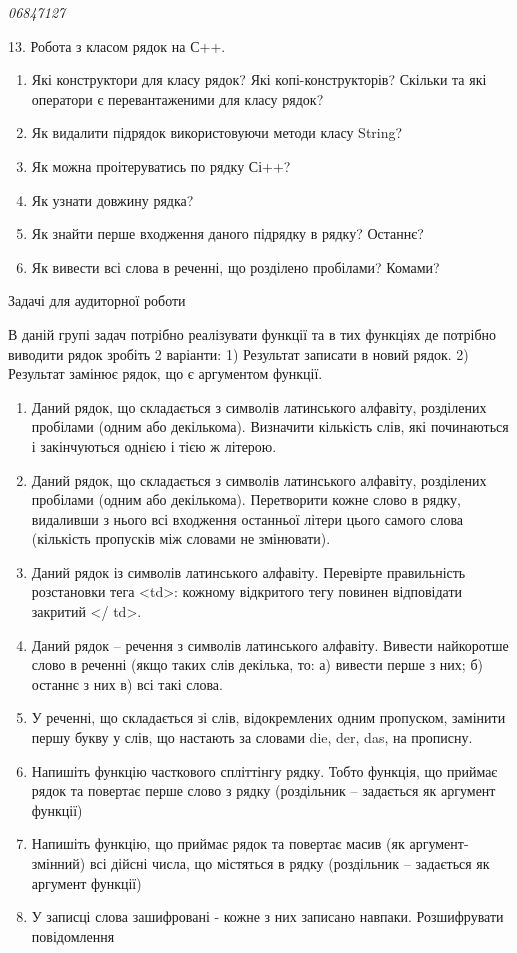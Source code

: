 \documentclass[]{article}
\begin{document}
\emph{06847127 }

13. Робота з класом рядок на С++.

\begin{enumerate}
\def\labelenumi{\arabic{enumi})}
\item
  Які конструктори для класу рядок? Які копі-конструкторів? Скільки та
  які оператори є перевантаженими для класу рядок?
\item
  Як видалити підрядок використовуючи методи класу String?
\item
  Як можна проітеруватись по рядку Сі++?
\item
  Як узнати довжину рядка?
\item
  Як знайти перше входження даного підрядку в рядку? Останнє?
\item
  Як вивести всі слова в реченні, що розділено пробілами? Комами?
\end{enumerate}

Задачі для аудиторної роботи

В даній групі задач потрібно реалізувати функції та в тих функціях де
потрібно виводити рядок зробіть 2 варіанти: 1) Результат записати в
новий рядок. 2) Результат замінює рядок, що є аргументом функції.

\begin{enumerate}
\def\labelenumi{\arabic{enumi})}
\item
  Даний рядок, що складається з символів латинського алфавіту,
  розділених пробілами (одним або декількома). Визначити кількість слів,
  які починаються і закінчуються однією і тією ж літерою.
\item
  Даний рядок, що складається з символів латинського алфавіту,
  розділених пробілами (одним або декількома). Перетворити кожне слово в
  рядку, видаливши з нього всі входження останньої літери цього самого
  слова (кількість пропусків між словами не змінювати).
\item
  Даний рядок із символів латинського алфавіту. Перевірте правильність
  розстановки тега \textless{}td\textgreater{}: кожному відкритого тегу
  повинен відповідати закритий \textless{}/ td\textgreater{}.
\item
  Даний рядок -- речення з символів латинського алфавіту. Вивести
  найкоротше слово в реченні \protect\hypertarget{_Hlk65949285}{}{}(якщо
  таких слів декілька, то: а) вивести перше з них; б) останнє з них в)
  всі такі слова.
\item
  У реченні, що складається зі слів, відокремлених одним пропуском,
  замінити першу букву у слів, що настають за словами die, der, das, на
  прописну.
\item
  Напишіть функцію часткового спліттінгу рядку. Тобто функція, що
  приймає рядок та повертає перше слово з рядку (роздільник -- задається
  як аргумент функції)
\item
  Напишіть функцію, що приймає рядок та повертає масив (як
  аргумент-змінний) всі дійсні числа, що містяться в рядку (роздільник
  -- задається як аргумент функції)
\item
  У записці слова зашифровані - кожне з них записано навпаки.
  Розшифрувати повідомлення
\end{enumerate}
\end{document}
